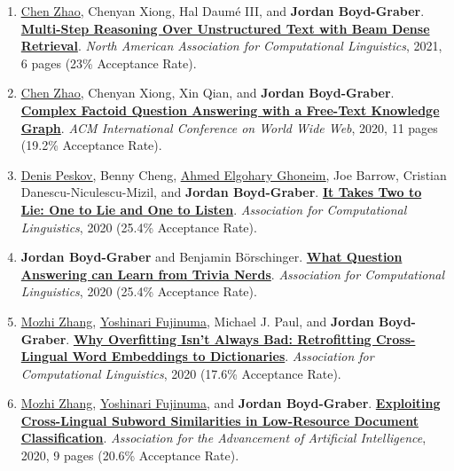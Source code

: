 {\begin{enumerate}
	 \item \underline{\href{https://henryzhao5852.github.io/}{Chen Zhao}}, Chenyan Xiong, Hal {Daum\'{e} III}, and {\bf Jordan Boyd-Graber}.  {\bf \href{http://cs.umd.edu/~jbg//docs/2021_naacl_multi_ance.pdf}{Multi-Step Reasoning Over Unstructured Text with Beam Dense Retrieval}}.  \emph{North American Association for Computational Linguistics}, 2021, 6 pages (23\% Acceptance Rate).

	 \item \underline{\href{https://henryzhao5852.github.io/}{Chen Zhao}}, Chenyan Xiong, Xin Qian, and {\bf Jordan Boyd-Graber}.  {\bf \href{http://cs.umd.edu/~jbg//docs/2020_www_delft.pdf}{Complex Factoid Question Answering with a Free-Text Knowledge Graph}}.  \emph{ACM International Conference on World Wide Web}, 2020, 11 pages (19.2\% Acceptance Rate).

	 \item \underline{\href{https://denis.ai/}{Denis Peskov}}, Benny Cheng, \underline{\href{https://aagohary.github.io/}{Ahmed Elgohary Ghoneim}}, Joe Barrow, Cristian Danescu-Niculescu-Mizil, and {\bf Jordan Boyd-Graber}.  {\bf \href{http://cs.umd.edu/~jbg//docs/2020_acl_diplomacy.pdf}{It Takes Two to Lie: One to Lie and One to Listen}}.  \emph{Association for Computational Linguistics}, 2020 (25.4\% Acceptance Rate).

	 \item {\bf Jordan Boyd-Graber} and Benjamin B\"orschinger.  {\bf \href{http://cs.umd.edu/~jbg//docs/2020_acl_trivia.pdf}{What Question Answering can Learn from Trivia Nerds}}.  \emph{Association for Computational Linguistics}, 2020 (25.4\% Acceptance Rate).

	 \item \underline{\href{http://www.mozhi.umiacs.io}{Mozhi Zhang}}, \underline{\href{http://akkikiki.github.io/about/}{Yoshinari Fujinuma}}, Michael J. Paul, and {\bf Jordan Boyd-Graber}.  {\bf \href{http://cs.umd.edu/~jbg//docs/2020_acl_refine.pdf}{Why Overfitting Isn't Always Bad: Retrofitting Cross-Lingual Word Embeddings to Dictionaries}}.  \emph{Association for Computational Linguistics}, 2020 (17.6\% Acceptance Rate).

	 \item \underline{\href{http://www.mozhi.umiacs.io}{Mozhi Zhang}}, \underline{\href{http://akkikiki.github.io/about/}{Yoshinari Fujinuma}}, and {\bf Jordan Boyd-Graber}.  {\bf \href{https://arxiv.org/abs/1812.09617}{Exploiting Cross-Lingual Subword Similarities in Low-Resource Document Classification}}.  \emph{Association for the Advancement of Artificial Intelligence}, 2020, 9 pages (20.6\% Acceptance Rate).


\end{enumerate}}
